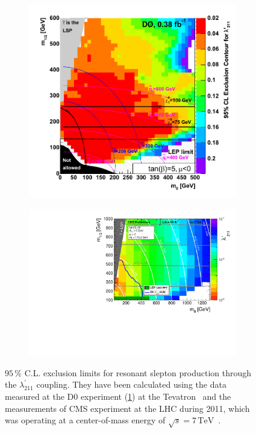 \begin{figure}[ht!]
  \centering
  \begin{subfigure}[b]{0.77\textwidth}
    \centering
    \includegraphics[width=\textwidth]{plots/auterrpv.pdf}
    \caption{\label{fig:auterrpv}}
  \end{subfigure}
  \begin{subfigure}[b]{0.77\textwidth}
    \centering
    \includegraphics[width=\textwidth]{plots/2011-l211limits_MultiBin_logz-colz.pdf}
    \caption{\label{fig:2011rpv}}
  \end{subfigure}
  \caption{$95\,\%$ C.L. exclusion limits for resonant slepton production through the $\lambda^{\prime}_{211}$ coupling. They have been calculated using the data measured at the D0 experiment (\ref{fig:auterrpv}) at the Tevatron~\cite{auter} and the measurements of CMS experiment at the LHC during 2011, which was operating at a center-of-mass energy of $\sqrt{s} = 7\,\text{TeV}$~\cite{2011rpv}.}
\end{figure}

